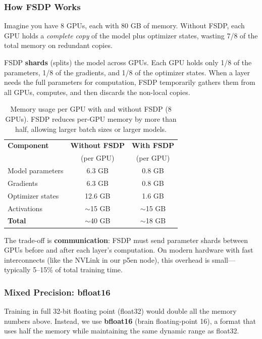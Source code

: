 \documentclass[11pt,a4paper]{article}
\begin{document}
\subsubsection{How FSDP Works}

Imagine you have 8 GPUs, each with 80 GB of memory. Without FSDP, each GPU holds a \emph{complete copy} of the model plus optimizer states, wasting 7/8 of the total memory on redundant copies.

FSDP \textbf{shards} (splits) the model across GPUs. Each GPU holds only 1/8 of the parameters, 1/8 of the gradients, and 1/8 of the optimizer states. When a layer needs the full parameters for computation, FSDP temporarily gathers them from all GPUs, computes, and then discards the non-local copies.

\begin{table}[H]
\centering
\begin{tabular}{lcc}
\toprule
\textbf{Component} & \textbf{Without FSDP} & \textbf{With FSDP} \\
 & (per GPU) & (per GPU) \\
\midrule
Model parameters & 6.3 GB & 0.8 GB \\
Gradients & 6.3 GB & 0.8 GB \\
Optimizer states & 12.6 GB & 1.6 GB \\
Activations & $\sim$15 GB & $\sim$15 GB \\
\midrule
\textbf{Total} & $\sim$40 GB & $\sim$18 GB \\
\bottomrule
\end{tabular}
\caption{Memory usage per GPU with and without FSDP (8 GPUs). FSDP reduces per-GPU memory by more than half, allowing larger batch sizes or larger models.}
\label{tab:fsdp_memory}
\end{table}

The trade-off is \textbf{communication}: FSDP must send parameter shards between GPUs before and after each layer's computation. On modern hardware with fast interconnects (like the NVLink in our p5en node), this overhead is small---typically 5--15\% of total training time.

\subsubsection{Mixed Precision: bfloat16}

Training in full 32-bit floating point (float32) would double all the memory numbers above. Instead, we use \textbf{bfloat16} (brain floating-point 16), a format that uses half the memory while maintaining the same dynamic range as float32.
\end{document}
